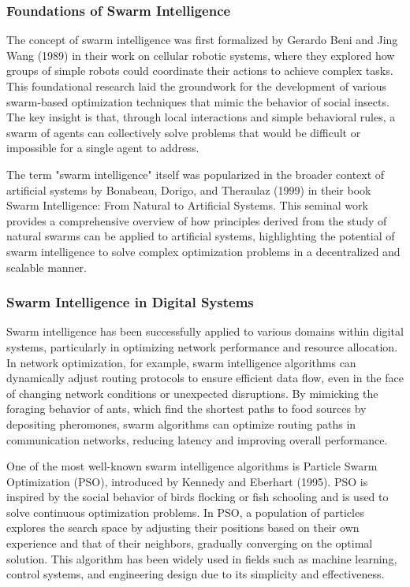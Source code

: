 \documentclass[12pt,twoside]{article}
\begin{document}
\subsubsection{Foundations of Swarm Intelligence}

The concept of swarm intelligence was first formalized by Gerardo Beni and Jing Wang (1989) in their work on cellular robotic systems, where they explored how groups of simple robots could coordinate their actions to achieve complex tasks. This foundational research laid the groundwork for the development of various swarm-based optimization techniques that mimic the behavior of social insects. The key insight is that, through local interactions and simple behavioral rules, a swarm of agents can collectively solve problems that would be difficult or impossible for a single agent to address.

The term "swarm intelligence" itself was popularized in the broader context of artificial systems by Bonabeau, Dorigo, and Theraulaz (1999) in their book Swarm Intelligence: From Natural to Artificial Systems. This seminal work provides a comprehensive overview of how principles derived from the study of natural swarms can be applied to artificial systems, highlighting the potential of swarm intelligence to solve complex optimization problems in a decentralized and scalable manner.

\subsubsection{Swarm Intelligence in Digital Systems}

Swarm intelligence has been successfully applied to various domains within digital systems, particularly in optimizing network performance and resource allocation. In network optimization, for example, swarm intelligence algorithms can dynamically adjust routing protocols to ensure efficient data flow, even in the face of changing network conditions or unexpected disruptions. By mimicking the foraging behavior of ants, which find the shortest paths to food sources by depositing pheromones, swarm algorithms can optimize routing paths in communication networks, reducing latency and improving overall performance.

One of the most well-known swarm intelligence algorithms is Particle Swarm Optimization (PSO), introduced by Kennedy and Eberhart (1995). PSO is inspired by the social behavior of birds flocking or fish schooling and is used to solve continuous optimization problems. In PSO, a population of particles explores the search space by adjusting their positions based on their own experience and that of their neighbors, gradually converging on the optimal solution. This algorithm has been widely used in fields such as machine learning, control systems, and engineering design due to its simplicity and effectiveness.
\end{document}
